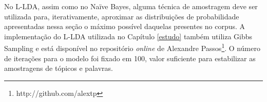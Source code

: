No L-LDA, assim como no Naïve Bayes, alguma técnica de amostragem deve ser utilizada para, iterativamente, aproximar as distribuições de probabilidade apresentadas nessa seção o máximo possível daquelas presentes no corpus. A implementação do L-LDA utilizada no Capítulo \ref{estudo} também utiliza Gibbs Sampling e está disponível no repositório \emph{online} de Alexandre Passos\footnote{http://github.com/alextp}. O número de iterações para o modelo foi fixado em 100, valor suficiente para estabilizar as amostragens de tópicos e palavras.



  


